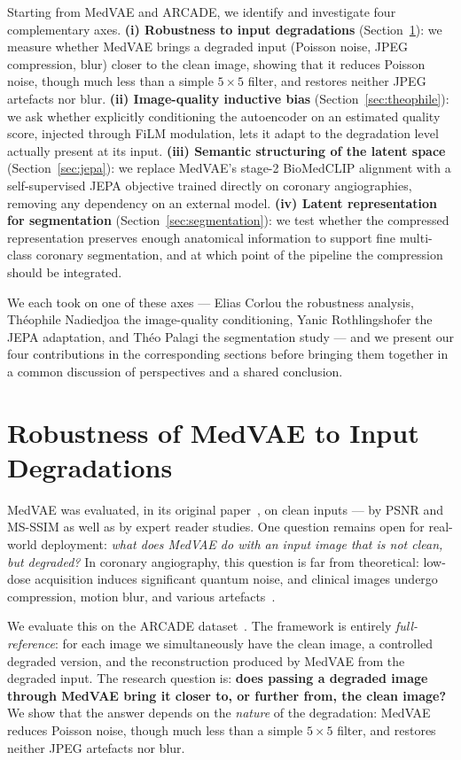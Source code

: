 \documentclass[conference]{IEEEtran}
\begin{document}
Starting from MedVAE and ARCADE, we identify and investigate four complementary axes. \textbf{(i) Robustness to input degradations} (Section~\ref{sec:medvae-robustness}): we measure whether MedVAE brings a degraded input (Poisson noise, JPEG compression, blur) closer to the clean image, showing that it reduces Poisson noise, though much less than a simple $5\times5$ filter, and restores neither JPEG artefacts nor blur. \textbf{(ii) Image-quality inductive bias} (Section~\ref{sec:theophile}): we ask whether explicitly conditioning the autoencoder on an estimated quality score, injected through FiLM modulation, lets it adapt to the degradation level actually present at its input. \textbf{(iii) Semantic structuring of the latent space} (Section~\ref{sec:jepa}): we replace MedVAE's stage-2 BioMedCLIP alignment with a self-supervised JEPA objective trained directly on coronary angiographies, removing any dependency on an external model. \textbf{(iv) Latent representation for segmentation} (Section~\ref{sec:segmentation}): we test whether the compressed representation preserves enough anatomical information to support fine multi-class coronary segmentation, and at which point of the pipeline the compression should be integrated.

We each took on one of these axes --- Elias Corlou the robustness analysis, Théophile Nadiedjoa the image-quality conditioning, Yanic Rothlingshofer the JEPA adaptation, and Théo Palagi the segmentation study --- and we present our four contributions in the corresponding sections before bringing them together in a common discussion of perspectives and a shared conclusion.

\newpage
\section{Robustness of MedVAE to Input Degradations}
\label{sec:medvae-robustness}

MedVAE was evaluated, in its original paper~\cite{varma2025medvaeefficientautomatedinterpretation}, on
clean inputs --- by PSNR and MS-SSIM as well as by expert reader
studies. One question remains open for real-world deployment:
\emph{what does MedVAE do with an input image that is not clean, but
degraded?} In coronary angiography, this question is far from
theoretical: low-dose acquisition induces significant quantum noise,
and clinical images undergo compression, motion blur, and various
artefacts~\cite{cesarelli2013xray}.

We evaluate this on the ARCADE dataset~\cite{popov2024arcade}. The
framework is entirely \emph{full-reference}: for each image we
simultaneously have the clean image, a controlled degraded version, and
the reconstruction produced by MedVAE from the degraded input. The
research question is: \textbf{does passing a degraded image through
MedVAE bring it closer to, or further from, the clean image?} We show
that the answer depends on the \emph{nature} of the degradation: MedVAE
reduces Poisson noise, though much less than a simple $5\times5$ filter,
and restores neither JPEG artefacts nor blur.
\end{document}

